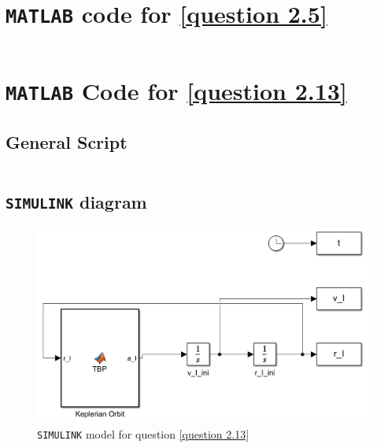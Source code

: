 \documentclass[hidelinks, 12pt]{article}%
\begin{document}
\clearpage
\appendixtitleon
\appendixtitletocon
\begin{appendices}

\section{\texttt{MATLAB} code for \ref{question 2.5}}
\label{2.5 appendix}

\inputminted{Matlab}{output_files/2.5/AERO_3240_2_5.m}
        \label{2.5 script}
            
\section{\texttt{MATLAB} Code for \ref{question 2.13}}
\label{2.13 appendix}
\subsection{General Script}

\inputminted[mathescape=true]{Matlab}{output_files/2.13/PROBA2.m}


\subsection{\texttt{SIMULINK} diagram}
 \begin{figure}[H]
        \begin{centering}
            \includegraphics[width=\textwidth]{output_files/2.13/model_2.13.png}
            \caption{\texttt{SIMULINK} model for question \ref{question 2.13}}
            \label{2.13 diagram}
        \end{centering}
    \end{figure}


\end{appendices}
\end{document}
